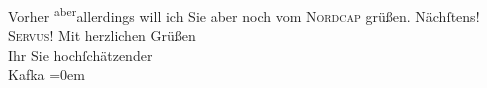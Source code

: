 \begin{ledgroupsized}[t]{13cm}
               Vorher \substVorne{}\textsuperscript{aber}\substDazwischen{}allerdings\substHinten{} will ich Sie \introOben{}aber\introOben{} noch vom \textsc{Nordcap} grüßen. Nächſtens!\pend
           \pstart
           \textsc{Servus}! Mit herzlichen Grüßen{\\[\baselineskip]}Ihr Sie hochſchätzender{\\[\baselineskip]}\spacefill\mbox{Kafka}\pend
           \leftskip=0em{}\endnumbering{}\end{ledgroupsized}  \newcommand{\dateiname}{L00162}\newcommand{\titel}{Eduard Michael Kafka an Arthur Schnitzler, 24. 1. 1893}\newcommand{\editorInnen}{Martin Anton Müller und Gerd-Hermann Susen}
      